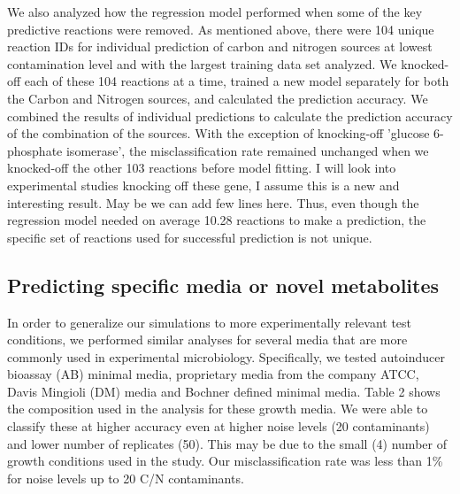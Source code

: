 \documentclass[12pt]{article}
\begin{document}
We also analyzed how the regression model performed when some of the key predictive reactions were removed. As mentioned above, there were 104 unique reaction IDs for individual prediction of carbon and nitrogen sources at lowest contamination level and with the largest training data set analyzed. We knocked-off each of these 104 reactions at a time, trained a new model separately for both the Carbon and Nitrogen sources, and calculated the prediction accuracy. We combined the results of individual predictions to calculate the prediction accuracy of the combination of the sources. With the exception of knocking-off 'glucose 6-phosphate isomerase', the misclassification rate remained unchanged when we knocked-off the other 103 reactions before model fitting. {\color{red} I will look into experimental studies knocking off these gene, I assume this is a new and interesting result. May be we can add few lines here.} Thus, even though the regression model needed on average 10.28 reactions to make a prediction, the specific set of reactions used for successful prediction is not unique.


\subsection*{Predicting specific media or novel metabolites}

In order to generalize our simulations to more experimentally relevant test conditions, we performed similar analyses for several media that are more commonly used in experimental microbiology. Specifically, we tested autoinducer bioassay (AB) minimal media, proprietary media from the company ATCC, Davis Mingioli (DM) media and Bochner defined minimal media. Table 2 shows the composition used in the analysis for these growth media. We were able to classify these at higher accuracy even at higher noise levels (20 contaminants) and lower number of replicates (50). This may be due to the small (4) number of growth conditions used in the study. Our misclassification rate was less than 1\% for noise levels up to 20 C/N contaminants.
\end{document}
